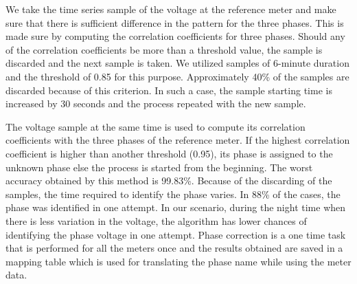 We take the time series sample of the voltage at the reference meter and make sure that there is sufficient difference in the pattern for the three phases. This is made sure by computing the correlation coefficients for three phases. Should any of the correlation coefficients be more than a threshold value, the sample is discarded and the next sample is taken. We utilized samples of 6-minute duration and the threshold of 0.85 for this purpose. Approximately 40\% of the samples are discarded because of this criterion. In such a case, the sample starting time is increased by 30 seconds and the process repeated with the new sample.

The voltage sample at the same time is used to compute its correlation coefficients with the three phases of the reference meter. If the highest correlation coefficient is higher than another threshold (0.95), its phase is assigned to the unknown phase else the process is started from the beginning. The worst accuracy obtained by this method is 99.83\%. Because of the discarding of the samples, the time required to identify the phase varies. In 88\% of the cases, the phase was identified in one attempt. In our scenario, during the night time when there is less variation in the voltage, the algorithm has lower chances of identifying the phase voltage in one attempt.
Phase correction is a one time task that is performed for all the meters once and the results obtained are saved in a mapping table which is used for translating the phase name while using the meter data.

